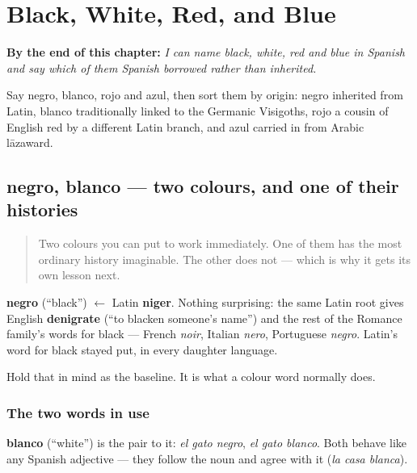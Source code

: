 
\chapter{Black, White, Red, and Blue}
\label{ch:spanish-black-white-red-blue}

\begin{chapteropening}
\textbf{By the end of this chapter:} \emph{I can name black, white, red and blue in Spanish and say which of them Spanish borrowed rather than inherited.}

Say negro, blanco, rojo and azul, then sort them by origin: negro inherited from Latin, blanco traditionally linked to the Germanic Visigoths, rojo a cousin of English red by a different Latin branch, and azul carried in from Arabic lāzaward.
\end{chapteropening}

\section[negro, blanco]{negro, blanco — two colours, and one of their histories}

\label{lesson:ES-C22-negro-blanco}



\begin{quote}
Two colours you can put to work immediately. One of them has the most ordinary history imaginable. The other does not — which is why it gets its own lesson next.
\end{quote}

\begin{cousinweb}
\textbf{negro} (\textquotedblleft{}black\textquotedblright{}) $\leftarrow$ Latin \textbf{niger}. Nothing surprising: the same Latin root gives English \textbf{denigrate} (\textquotedblleft{}to blacken someone's name\textquotedblright{}) and the rest of the Romance family's words for black — French \emph{noir}, Italian \emph{nero}, Portuguese \emph{negro}. Latin's word for black stayed put, in every daughter language.

Hold that in mind as the baseline. It is what a colour word normally does.
\end{cousinweb}

\subsection*{The two words in use}
\textbf{blanco} (\textquotedblleft{}white\textquotedblright{}) is the pair to it: \emph{el gato negro}, \emph{el gato blanco}. Both behave like any Spanish adjective — they follow the noun and agree with it (\emph{la casa blanca}).

